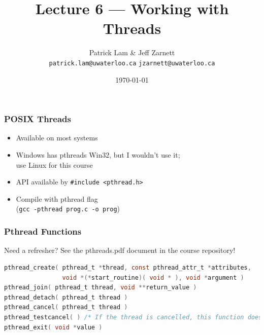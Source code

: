 

\title{Lecture 6 --- Working with Threads }

\author{Patrick Lam \& Jeff Zarnett \\ \small \texttt{patrick.lam@uwaterloo.ca} \texttt{jzarnett@uwaterloo.ca}}
\date{\today}




\begin{frame}
  \titlepage

 \end{frame}



\begin{frame}
  \frametitle{POSIX Threads}


  \begin{itemize}
    \item Available on most systems
    \vfill
    \item Windows has pthreads Win32, but I wouldn't use it; \\use Linux for
          this course
    \vfill
    \item API available by {\tt \#include <pthread.h>}
    \vfill
    \item Compile with pthread flag \\ ({\tt gcc -pthread prog.c -o prog})
  \end{itemize}

\end{frame}



\begin{frame}[fragile]
\frametitle{Pthread Functions}

Need a refresher? See the pthreads.pdf document in the course repository!

\begin{lstlisting}[language=C]
pthread_create( pthread_t *thread, const pthread_attr_t *attributes,
                void *(*start_routine)( void * ), void *argument )
pthread_join( pthread_t thread, void **return_value )
pthread_detach( pthread_t thread )
pthread_cancel( pthread_t thread )
pthread_testcancel( ) /* If the thread is cancelled, this function does not return (thread terminated) */
pthread_exit( void *value )
\end{lstlisting}


\end{frame}

